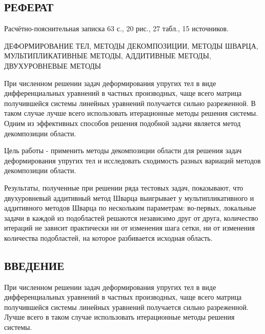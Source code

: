 \documentclass[a4paper, 14pt]{extarticle}
\begin{document}
\newpage

\begin{center}
\section*{\centering РЕФЕРАТ}
\end{center}
\setcounter{page}{2}

Расчётно-пояснительная записка 63 с., 20 рис., 27 табл., 15 источников.

ДЕФОРМИРОВАНИЕ ТЕЛ, МЕТОДЫ ДЕКОМПОЗИЦИИ, МЕТОДЫ ШВАРЦА, МУЛЬТИПЛИКАТИВНЫЕ МЕТОДЫ, АДДИТИВНЫЕ МЕТОДЫ, ДВУХУРОВНЕВЫЕ МЕТОДЫ

При численном решении задач деформирования упругих тел в виде дифференциальных уравнений в частных производных, чаще всего матрица получившейся системы линейных уравнений получается сильно разреженной. В таком случае лучше всего использовать итерационные методы решения системы. Одним из эффективных способов решения подобной задачи является метод декомпозиции области.

Цель работы - применить методы декомпозиции области для решения задач деформирования упругих тел и исследовать сходимость разных вариаций методов декомпозиции области.

Результаты, полученные при решении ряда тестовых задач, показывают, что двухуровневый аддитивный метод Шварца выигрывает у мультипликативного и аддитивного методов Шварца по нескольким параметрам: во-первых, локальные задачи в каждой из подобластей решаются независимо друг от друга, количество итераций не зависит практически ни от изменения шага сетки, ни от изменения количества подобластей, на которое разбивается исходная область.

\newpage

\renewcommand*\contentsname{\begin{center}СОДЕРЖАНИЕ\end{center}}
	
\tableofcontents

\newpage

\begin{center}
\section*{\centering ВВЕДЕНИЕ}
\end{center}

При численном решении задач деформирования упругих тел в виде дифференциальных уравнений в частных производных, чаще всего матрица получившейся системы линейных уравнений получается сильно разреженной. Лучше всего в таком случае использовать итерационные методы решения системы. 
\end{document}

